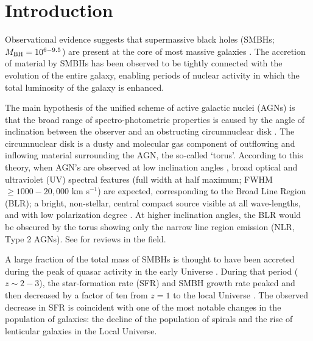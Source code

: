 \documentclass[modern]{aastex631}
\begin{document}

\section{Introduction}
 \label{sec:intro}
Observational evidence suggests that supermassive black holes (SMBHs; $M_{\rm BH}=10^{6-9.5}$) are present at the core of most massive galaxies \citep{kormendy+2013araa51_511}. The accretion of material by SMBHs has been observed to be tightly connected with the evolution of the entire galaxy, enabling periods of nuclear activity in which the total luminosity of the galaxy is enhanced. 

The main hypothesis of the unified scheme of active galactic nuclei (AGNs) is that the broad range of spectro-photometric properties is caused by the angle of inclination between the observer and an obstructing circumnuclear disk \citep{antonucci1993araa31_473, urry+1995pasp107_803}. The circumnuclear disk is a dusty and molecular gas component of outflowing and inflowing material surrounding the AGN, the so-called `torus'. According to this theory, when AGN's are observed at low inclination angles \citep[$i<45$--$60^{\circ}$, where $i=0^{\circ}$ would be face-on,][]{marin2014mnras441_551}, broad optical and ultraviolet (UV) spectral features (full width at half maximum; FWHM $\geq 1000-20,000$ km s$^{-1}$) are expected, corresponding to the Broad Line Region (BLR); a bright, non-stellar, central compact source visible at all wave-lengths, and with low polarization degree \citep[Type 1 AGNs,][]{netzer2015araa53_365}. At higher inclination angles, the BLR would be obscured by the torus showing only the narrow line region emission (NLR, Type 2 AGNs). See \citet{peterson2006incollection_77, netzer2015araa53_365, ramosalmeida+2017nat1_679} for reviews in the field.


A large fraction of the total mass of SMBHs is thought to have been accreted during the peak of quasar activity in the early Universe \citep[$z=2-3$,][]{boyle+1998mnras293_49, delvecchio+2014mnras439_2736, madau+2014araa52_415}. During that period ($z\sim2-3$), the star-formation rate (SFR) and SMBH growth rate peaked and then decreased by a factor of ten from $z=1$ to the local Universe \citep{shankar+2009apj690_20}. The observed decrease in SFR is coincident with one of the most notable changes in the population of galaxies: the decline of the population of spirals and the rise of lenticular galaxies in the Local Universe.
\end{document}
